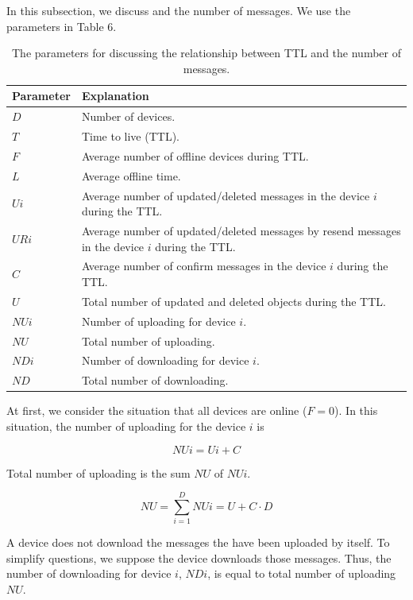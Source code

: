 \documentclass[twocolumn,10pt]{article}
\begin{document}
In this subsection, we discuss and the number of messages. 
We use the parameters in Table 6.

\begin{table}[t]
	\centering
	\caption{The parameters for discussing the relationship between TTL and the number of messages.}
	\begin{tabular}{ll}
		\hline
		\textbf{Parameter} & \textbf{Explanation} \\ \hline
		$D$ & Number of devices. \\
		$T$ & Time to live (TTL). \\
		$F$ & Average number of offline devices during TTL. \\
		$L$ & Average offline time. \\
		$Ui$ & Average number of updated/deleted messages in the device $i$ during the TTL. \\ 
		$URi$ &  Average number of updated/deleted messages by resend messages in the device $i$ during the TTL.\\ 
		$C$ & Average number of confirm messages in the device $i$ during the TTL. \\ 
		$U$ & Total number of updated and deleted objects during the TTL. \\ 
		$NUi$ & Number of uploading for device $i$. \\
		$NU$ & Total number of uploading. \\
		$NDi$ & Number of downloading for device $i$. \\
		$ND$ & Total number of downloading. \\ \hline
	\end{tabular}
\end{table}

At first, we consider the situation that all devices are online ($F=0$).
In this situation, the number of uploading for the device $i$ is

\begin{equation}
NUi = Ui + C
\end{equation}

Total number of uploading is the sum $NU$ of $NUi$.

\begin{equation}
NU = \sum_{i=1}^{D} NUi = U + C \cdot D
\end{equation}

A device does not download the messages the have been uploaded by itself.
To simplify questions, we suppose the device downloads those messages.
Thus, the number of downloading for device $i$, $NDi$, is equal to total number of uploading $NU$.
\end{document}
